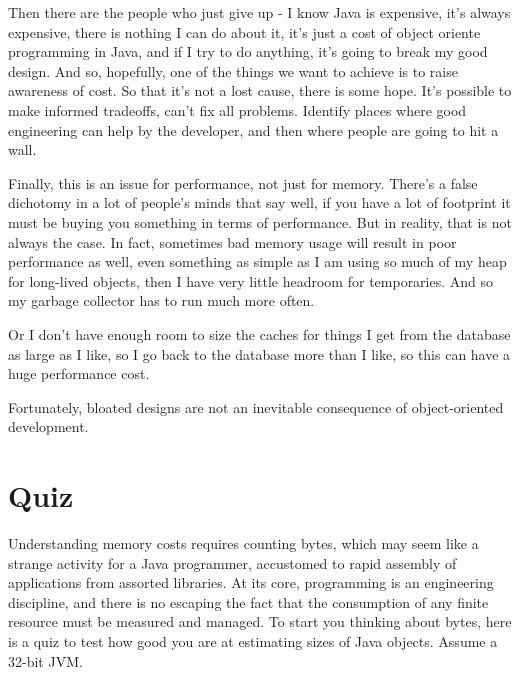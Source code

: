 Then there are the people who just give up - I know Java is expensive, it's always expensive, 
there is nothing I can do about it, it's just a cost of object oriente programming in Java, and if I try to do anything, 
it's going to break my good design.
And so, hopefully, one of the things we want to achieve is to raise awareness of cost. 
So that it's not a lost cause, there is some hope.  It's possible to make informed tradeoffs, can't fix all problems. 
Identify places where good engineering can help by the developer, and then where people are going to hit a wall.

Finally, this is an issue for performance, not just for memory. 
There's a false dichotomy in a lot of people's minds that say well, if you have a lot of footprint it must be buying
 you something in terms of performance. But in reality, that is not always the case. In fact, sometimes bad memory usage
  will result in poor performance as well, even something as simple as I am using so much of my heap for long-lived objects, 
  then I have very little headroom for temporaries.  And so my garbage collector has to run much more often. 

Or I don't have enough room to size the caches for things I get from the database as large as I like, 
so I go back to the database more than I like, so this can have a huge performance cost.

Fortunately, bloated designs are not an inevitable consequence of object-oriented development.

\section{Quiz}

Understanding memory costs requires counting bytes, which may seem like a strange activity for a Java programmer,
 accustomed to rapid assembly of applications from assorted libraries. At its core, programming is an engineering discipline, 
 and there is no escaping the fact that the consumption of any finite resource must be measured and managed.  
 To start you thinking about bytes, here is a quiz to test how good you are at estimating sizes of Java objects. 
 Assume a 32-bit JVM.
 
